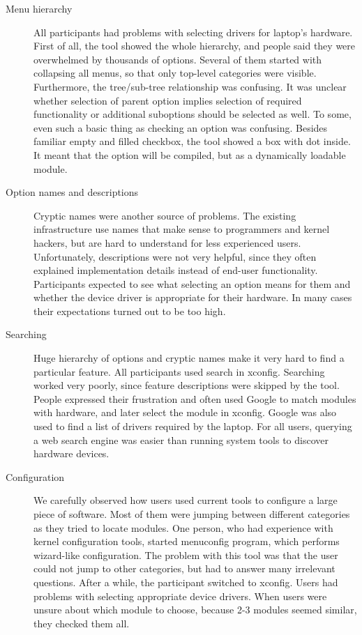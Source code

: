 \documentclass{chi2009}
\begin{document}
\begin{description}
  \item[Menu hierarchy]
All participants had problems with selecting drivers for laptop's hardware. First of all, the tool showed the whole hierarchy, and people said they were overwhelmed by thousands of options. Several of them started with collapsing all menus, so that only top-level categories were visible. Furthermore, the tree/sub-tree relationship was confusing. It was unclear whether selection of parent option implies selection of required functionality or additional suboptions should be selected as well. To some, even such a basic thing as checking an option was confusing. Besides familiar empty and filled checkbox, the tool showed a box with dot inside. It meant that the option will be compiled, but as a dynamically loadable module.

  \item[Option names and descriptions]
Cryptic names were another source of problems. The existing infrastructure use names that make sense to programmers and kernel hackers, but are hard to understand for less experienced users. Unfortunately, descriptions were not very helpful, since they often explained implementation details instead of end-user functionality. Participants expected to see what selecting an option means for them and whether the device driver is appropriate for their hardware. In many cases their expectations turned out to be too high.

  \item[Searching]
Huge hierarchy of options and cryptic names make it very hard to find a particular feature. All participants used search in \textsf{xconfig}. Searching worked very poorly, since feature descriptions were skipped by the tool. People expressed their frustration and often used Google to match modules with hardware, and later select the module in \textsf{xconfig}. Google was also used to find a list of drivers required by the laptop. For all users, querying a web search engine was easier than running system tools to discover hardware devices.

  \item[Configuration]
We carefully observed how users used current tools to configure a large piece of software. Most of them were jumping between different categories as they tried to locate modules. One person, who had experience with kernel configuration tools, started \textsf{menuconfig} program, which performs wizard-like configuration. The problem with this tool was that the user could not jump to other categories, but had to answer many irrelevant questions. After a while, the participant switched to \textsf{xconfig}. Users had problems with selecting appropriate device drivers. When users were unsure about which module to choose, because 2-3 modules seemed similar, they checked them all. 
\end{description}
\end{document}

